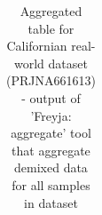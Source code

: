 \begin{landscape}
\begin{table}[ht!]
\begin{tabular}{l|l|l|l|l|l}
                \end{tabular}
                \caption{Aggregated table for Californian real-world dataset (PRJNA661613) - output of 'Freyja: aggregate' tool that aggregate demixed data for all samples in dataset} \label{tab:appendix:freyja}
                \end{table}
                \vfill
            \end{landscape}
        
        
\clearpage

